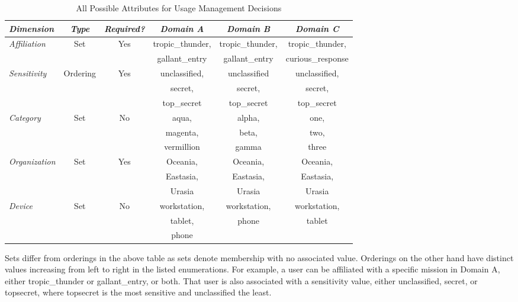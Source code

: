 \begin{table*}[tp] %
\centering %
\begin{tabular}{lccccc}
\toprule %
\emph{Dimension}		& \emph{Type}	& \emph{Required?}	& \emph{Domain A}	& \emph{Domain B}	& \emph{Domain C} 	\\\toprule
\emph{Affiliation} 	& Set 			& Yes 				& tropic\_thunder, 	& tropic\_thunder,	& tropic\_thunder, 	\\
					&				&					& gallant\_entry		& gallant\_entry		& curious\_response	\\\midrule
\emph{Sensitivity} 	& Ordering 		& Yes 				& unclassified,		& unclassified		& unclassified,		\\
					&				&					& secret,			& secret,			& secret,			\\
					&				&					& top\_secret		& top\_secret		& top\_secret		\\\midrule
\emph{Category}		& Set 			& No 				& aqua,				& alpha,				& one,				\\
					&				&					& magenta,			& beta,				& two,				\\
					&				&					& vermillion			& gamma				& three				\\\midrule
\emph{Organization}	& Set 			& Yes 				& Oceania, 			& Oceania,			& Oceania,			\\
					&				&					& Eastasia,			& Eastasia,			& Eastasia,			\\
					&				&					& Urasia				& Urasia				& Urasia				\\\midrule
\emph{Device}	 	& Set 			& No 				& workstation, 		& workstation,		& workstation, 		\\
					&				&					& tablet,			& phone				& tablet				\\
					&				&					& phone				& 					& 					\\\midrule
\end{tabular}
\caption{All Possible Attributes for Usage Management Decisions}
\label{table:model:network-attributes}
\end{table*}

Sets differ from orderings in the above table as sets denote membership with no associated value.  Orderings on the other hand have distinct values increasing from left to right in the listed enumerations.  For example, a user can be affiliated with a specific mission in Domain A, either tropic\_thunder or gallant\_entry, or both.  That user is also associated with a sensitivity value, either unclassified, secret, or topsecret, where topsecret is the most sensitive and unclassified the least.

